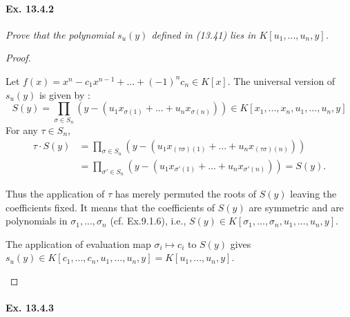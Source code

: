 \documentclass[11pt,a4paper]{article}
\newcommand{\be} {\begin{enumerate}}
\newcommand{\ee} {\end{enumerate}}
\begin{document}
\paragraph{Ex. 13.4.2}

{\it Prove that the polynomial $s_u(y)$ defined in (13.41) lies in $K[u_1,...,u_n,y]$.
\begin{proof}
\be
Let $f(x)=x^n-c_1x^{n-1}+...+(-1)^n c_n \in K[x]$. The universal version of $s_u(y)$ is given by :
$$S(y)=\prod_{\sigma\in S_n} ( y - (u_1x_{\sigma(1)}+...+u_nx_{\sigma(n)}))\in K[x_1,...,x_n,u_1,...,u_n,y]$$
For any $\tau \in S_n$, 
\begin{align*}
\tau \cdot S(y)&=\prod_{\sigma\in S_n} ( y - (u_1x_{(\tau\sigma)(1)}+...+u_nx_{(\tau\sigma)(n)}))\\&=\prod_{\sigma'\in S_n} ( y - (u_1x_{\sigma'(1)}+...+u_nx_{\sigma'(n)}))=S(y).
\end{align*}

Thus the application of $\tau$ has merely permuted the roots of $S(y)$ leaving the coefficients fixed. It means that the coefficients of $S(y)$ are symmetric and are polynomials in $\sigma_1,...,\sigma_n$ (cf. Ex.9.1.6), i.e., $S(y)\in K[\sigma_1,...,\sigma_n,u_1,...,u_n,y]$.

The application of evaluation map $\sigma_i \mapsto c_i$ to $S(y)$ gives $s_u(y) \in K[c_1,...,c_n,u_1,...,u_n,y] = K[u_1,...,u_n,y]$. 

\ee\end{proof}
}

\paragraph{Ex. 13.4.3}
\end{document}
